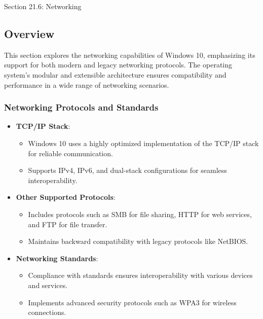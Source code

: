 \begin{notes}{Section 21.6: Networking}
    \subsection*{Overview}
    This section explores the networking capabilities of Windows 10, emphasizing its support for both modern and legacy networking protocols. The operating system's modular and extensible architecture 
    ensures compatibility and performance in a wide range of networking scenarios.
    
    \subsubsection*{Networking Protocols and Standards}
    \begin{itemize}
        \item \textbf{TCP/IP Stack}:
        \begin{itemize}
            \item Windows 10 uses a highly optimized implementation of the TCP/IP stack for reliable communication.
            \item Supports IPv4, IPv6, and dual-stack configurations for seamless interoperability.
        \end{itemize}
        \item \textbf{Other Supported Protocols}:
        \begin{itemize}
            \item Includes protocols such as SMB for file sharing, HTTP for web services, and FTP for file transfer.
            \item Maintains backward compatibility with legacy protocols like NetBIOS.
        \end{itemize}
        \item \textbf{Networking Standards}:
        \begin{itemize}
            \item Compliance with standards ensures interoperability with various devices and services.
            \item Implements advanced security protocols such as WPA3 for wireless connections.
        \end{itemize}
    \end{itemize}
    

\end{notes}
